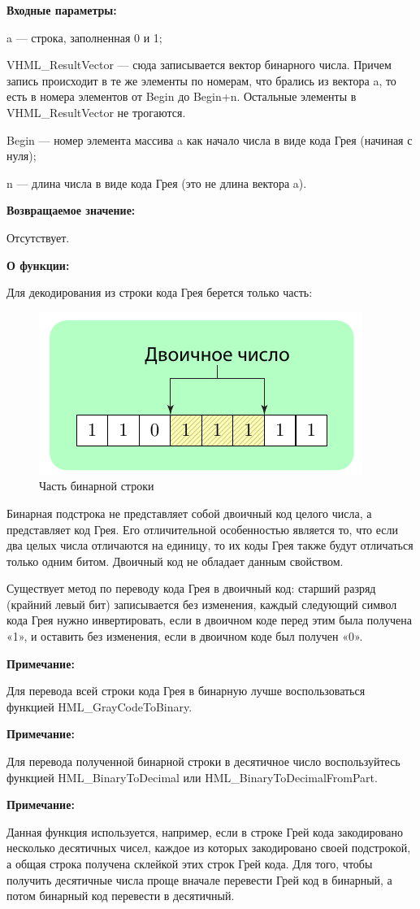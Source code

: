 \textbf{Входные параметры:}
 
 a --- строка, заполненная 0 и 1;
 
 VHML\_ResultVector --- сюда записывается вектор бинарного числа. Причем запись происходит в те же элементы по номерам, что брались из вектора a, то есть в номера элементов от Begin до Begin+n. Остальные элементы в VHML\_ResultVector не трогаются.
 
 Begin --- номер элемента массива a как начало числа в виде кода Грея (начиная с нуля);
 
 n --- длина числа в виде кода Грея (это не длина вектора a).
 
\textbf{Возвращаемое значение:}

 Отсутствует.
 
\textbf{О функции:}

Для декодирования из строки кода Грея берется только часть:

\begin{figure} [h]
  \center
  \includegraphics [scale=1] {HML_BinaryToDecimalFromPart_Sheme}
  \caption{Часть бинарной строки} 
  \label{img:HML_BinaryToDecimalFromPart_Sheme}  
\end{figure}

Бинарная подстрока не представляет собой двоичный код целого числа, а представляет код Грея. Его отличительной особенностью является то, что если два целых числа отличаются на единицу, то их коды Грея также будут отличаться только одним битом. Двоичный код не обладает данным свойством.

Существует метод по переводу кода Грея в двоичный код: старший разряд (крайний левый бит) записывается без изменения, каждый следующий символ кода Грея нужно инвертировать, если в двоичном коде перед этим была получена «1», и оставить без изменения, если в двоичном коде был получен «0».
 
 \textbf{Примечание:}
 
 Для перевода всей строки кода Грея в бинарную лучше воспользоваться функцией HML\_GrayCodeToBinary.

 \textbf{Примечание:}

 Для перевода полученной бинарной строки в десятичное число воспользуйтесь функцией HML\_BinaryToDecimal или HML\_BinaryToDecimalFromPart.

 \textbf{Примечание:}
 
 Данная функция используется, например, если в строке Грей кода закодировано несколько десятичных чисел, каждое из которых закодировано своей подстрокой, а общая строка получена склейкой этих строк Грей кода. Для того, чтобы получить десятичные числа проще вначале перевести Грей код в бинарный, а потом бинарный код перевести в десятичный.